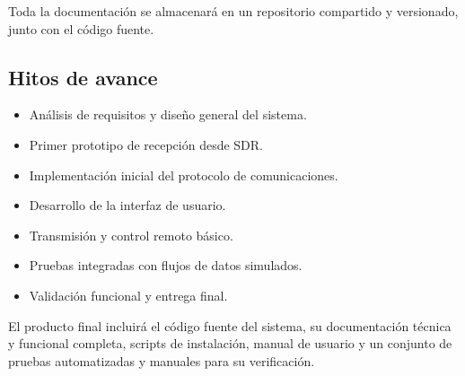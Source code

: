 Toda la documentación se almacenará en un repositorio compartido y versionado, junto con el código fuente.

\subsection*{Hitos de avance}

\begin{itemize}
    \item Análisis de requisitos y diseño general del sistema.
    \item Primer prototipo de recepción desde SDR.
    \item Implementación inicial del protocolo de comunicaciones.
    \item Desarrollo de la interfaz de usuario.
    \item Transmisión y control remoto básico.
    \item Pruebas integradas con flujos de datos simulados.
    \item Validación funcional y entrega final.
\end{itemize}

El producto final incluirá el código fuente del sistema, su documentación técnica y funcional completa, scripts de instalación, manual de usuario y un conjunto de pruebas automatizadas y manuales para su verificación.